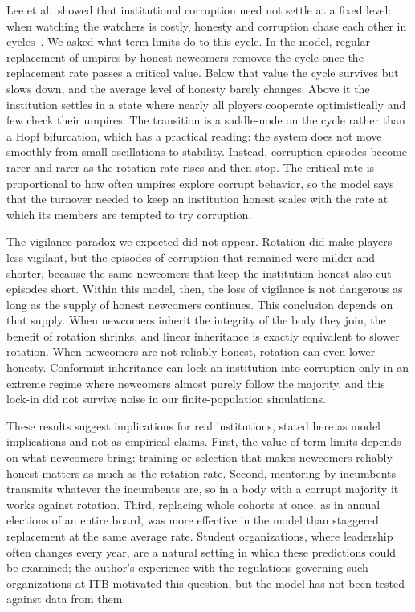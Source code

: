 \documentclass[11pt]{article}
\begin{document}
Lee et al.\ showed that institutional corruption need not settle at a fixed level: when watching
the watchers is costly, honesty and corruption chase each other in cycles~\cite{lee2019social}.
We asked what term limits do to this cycle. In the model, regular replacement of umpires by
honest newcomers removes the cycle once the replacement rate passes a critical value. Below that
value the cycle survives but slows down, and the average level of honesty barely changes. Above
it the institution settles in a state where nearly all players cooperate optimistically and few
check their umpires. The transition is a saddle-node on the cycle rather than a Hopf bifurcation,
which has a practical reading: the system does not move smoothly from small oscillations to
stability. Instead, corruption episodes become rarer and rarer as the rotation rate rises and then
stop. The critical rate is proportional to how often umpires explore corrupt behavior, so the
model says that the turnover needed to keep an institution honest scales with the rate at which
its members are tempted to try corruption.

The vigilance paradox we expected did not appear. Rotation did make players less vigilant, but
the episodes of corruption that remained were milder and shorter, because the same newcomers that
keep the institution honest also cut episodes short. Within this model, then, the loss of
vigilance is not dangerous as long as the supply of honest newcomers continues. This conclusion
depends on that supply. When newcomers inherit the integrity of the body they join, the benefit
of rotation shrinks, and linear inheritance is exactly equivalent to slower rotation. When
newcomers are not reliably honest, rotation can even lower honesty. Conformist inheritance can
lock an institution into corruption only in an extreme regime where newcomers almost purely
follow the majority, and this lock-in did not survive noise in our finite-population simulations.

These results suggest implications for real institutions, stated here as model implications and
not as empirical claims. First, the value of term limits depends on what newcomers bring:
training or selection that makes newcomers reliably honest matters as much as the rotation rate.
Second, mentoring by incumbents transmits whatever the incumbents are, so in a body with a corrupt
majority it works against rotation. Third, replacing whole cohorts at once, as in annual
elections of an entire board, was more effective in the model than staggered replacement at the
same average rate. Student organizations, where leadership often changes every year, are a
natural setting in which these predictions could be examined; the author's experience with the
regulations governing such organizations at ITB motivated this question, but the model has not
been tested against data from them.
\end{document}
